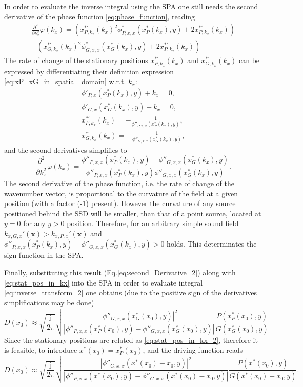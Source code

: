 \documentclass[12pt,a4paper]{article}
\newcommand{\ti}{\mathrm{j}}
\newcommand{\vx}{\mathbf{x}}
\begin{document}
In order to evaluate the inverse integral using the SPA one still needs the second derivative of the phase function \eqref{eq:phase_function}, reading
\begin{multline}
\frac{\partial^2}{\partial k_x^2} \varphi(k_x) = 
 \left( x^{*'}_{P,k_x}(k_x)^2 \phi_{P,x,x}^{''}(x^*_P (k_x),y)  + 2 x^{*'}_{P,k_x}(k_x)\right) 
\\
-\left( x^{*'}_{G,k_x}(k_x)^2 \phi_{G,x,x}^{''}(x^*_G(k_x),y)  +  2 x^{*'}_{P,k_x}(k_x)\right) 
\label{eq:second_Derivative}
\end{multline}
The rate of change of the stationary positions $ x^{*'}_{P,k_x}(k_x)$ and $ x^{*'}_{G,k_x}(k_x)$ can be expressed by differentiating their definition expression \eqref{eq:xP_xG_in_spatial_domain} w.r.t. $k_x$:
\begin{eqnarray}
\phi'_{P,x}(x^*_P(k_x),y) + k_x = 0, \\
\phi'_{G,x}(x^*_G(k_x),y) + k_x = 0, \\
x^{*'}_{P,k_x}(k_x) = -\frac{1}{ \phi{''}_{P,x,x}(x^*_P(k_x),y) }, \\
x^{*'}_{G,k_x}(k_x) = -\frac{1}{ \phi{''}_{G,x,x}(x^*_G(k_x),y) }, 
\end{eqnarray}
and the second derivatives simplifies to
\begin{equation}
\frac{\partial^2}{\partial k_x^2} \varphi(k_x) = \frac{ \phi{''}_{P,x,x}(x^*_P(k_x),y) - \phi{''}_{G,x,x}(x^*_G(k_x),y)}{\phi{''}_{P,x,x}(x^*_P(k_x),y) \phi{''}_{G,x,x}(x^*_G(k_x),y)}.
\label{eq:second_Derivative_2}
\end{equation}
The second derivative of the phase function, i.e. the rate of change of the wavenumber vector, is proportional to the curvature of the field at a given position (with a factor (-1) present). However the curvature of any source positioned behind the SSD will be smaller, than that of a point source, located at $y = 0$ for any $y>0$ position.
Therefore, for an arbitrary simple sound field $k_{x,G,x}'(\vx) > k_{x,P,x}'(\vx)$ and $\phi{''}_{P,x,x}(x^*_P(k_x),y) - \phi{''}_{G,x,x}(x^*_G(k_x),y) >0$ holds. This determinates the sign function in the SPA.

Finally, substituting this result (Eq.\eqref{eq:second_Derivative_2}) along with \eqref{eq:stat_pos_in_kx} into the SPA in order to evaluate integral \eqref{eq:inverse_transform_2} one obtains (due to the positive sign of the derivatives simplifications may be done)
\begin{equation}
D(x_0) \approx
\sqrt{\frac{\ti}{2\pi}} 
\sqrt{\frac{ \left| \phi{''}_{G,x,x}(x^*_G(x_0),y )\right|^2}{\left| \phi{''}_{P,x,x}(x^*_P(x_0),y) - \phi{''}_{G,x,x}(x^*_G(x_0),y)\right|}}
\frac{P(x^*_P(x_0),y)}{G(x^*_G(x_0),y)}
\end{equation}
Since the stationary positions are related as \eqref{eq:stat_pos_in_kx_2}, therefore it is feasible, to introduce $x^*(x_0) = x^*_P(x_0)$, and the driving function reads
\begin{equation}
D(x_0) \approx
\sqrt{\frac{\ti}{2\pi}} 
\sqrt{\frac{ \left| \phi{''}_{G,x,x}(x^*(x_0)-x_0,y )\right|^2}{\left| \phi{''}_{P,x,x}(x^*(x_0),y) - \phi{''}_{G,x,x}(x^*(x_0) - x_0,y)\right|}}
\frac{P(x^*(x_0),y)}{G(x^*(x_0) - x_0,y)}.
\label{eq:spatial_sdm}
\end{equation}
\end{document}
